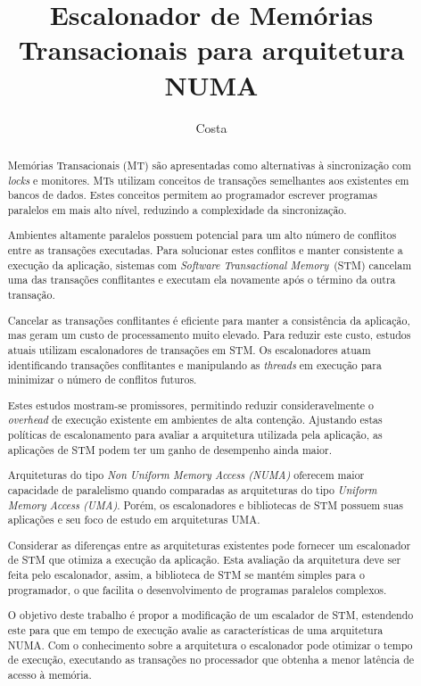 \documentclass[diss-proposta,nocipinfo]{texufpel}
\title{Escalonador de Memórias Transacionais para arquitetura NUMA}
\author{Costa}{Michael Alexandre}
\begin{document}
\maketitle
\sloppy

\begin{abstract}

  Memórias Transacionais (MT) são apresentadas como alternativas à sincronização com \emph{locks} e monitores. MTs utilizam conceitos de transações semelhantes aos existentes em bancos de dados. Estes conceitos permitem ao programador escrever programas paralelos em mais alto nível, reduzindo a complexidade da sincronização.

  Ambientes altamente paralelos possuem potencial para um alto número de conflitos entre as transações executadas. Para solucionar estes conflitos e manter consistente a execução da aplicação, sistemas com \emph{Software Transactional Memory}~(STM) cancelam uma das transações conflitantes e executam ela novamente após o término da outra transação.

  Cancelar as transações conflitantes é eficiente para manter a consistência da aplicação, mas geram um custo de processamento muito elevado. Para reduzir este custo, estudos atuais utilizam escalonadores de transações em STM. Os escalonadores atuam identificando transações conflitantes e manipulando as \emph{threads} em execução para minimizar o número de conflitos futuros.

  Estes estudos mostram-se promissores, permitindo reduzir consideravelmente o \emph{overhead} de execução existente em ambientes de alta contenção. Ajustando estas políticas de escalonamento para avaliar a arquitetura utilizada pela aplicação, as aplicações de STM podem ter um ganho de desempenho ainda maior.

  Arquiteturas do tipo \emph{Non Uniform Memory Access (NUMA)} oferecem maior capacidade de paralelismo quando comparadas as arquiteturas do tipo \emph{Uniform Memory Access (UMA)}. Porém, os escalonadores e bibliotecas de STM possuem suas aplicações e seu foco de estudo em arquiteturas UMA.

  Considerar as diferenças entre as arquiteturas existentes pode fornecer um escalonador de STM que otimiza a execução da aplicação. Esta avaliação da arquitetura deve ser feita pelo escalonador, assim, a biblioteca de STM se mantém simples para o programador, o que facilita o desenvolvimento de programas paralelos complexos.

  O objetivo deste trabalho é propor a modificação de um escalador de STM, estendendo este para que em tempo de execução avalie as características de uma arquitetura NUMA. Com o conhecimento sobre a arquitetura o escalonador pode otimizar o tempo de execução, executando as transações no processador que obtenha a menor latência de acesso à memória.


\end{abstract}
\end{document}
